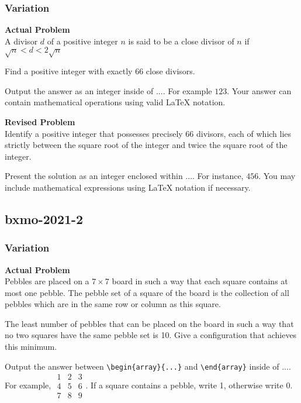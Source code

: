 \subsubsection{Variation}
\textbf{Actual Problem}\\
A divisor $d$ of a positive integer $n$ is said to be a close divisor of $n$ if $\sqrt{n} < d < 2\sqrt{n}$

Find a positive integer with exactly 66 close divisors.

Output the answer as an integer inside of $\boxed{...}$. For example $\boxed{123}$.
Your answer can contain mathematical operations using valid LaTeX notation.

\textbf{Revised Problem}\\
Identify a positive integer that possesses precisely 66 divisors, each of which lies strictly between the square root of the integer and twice the square root of the integer.

Present the solution as an integer enclosed within $\boxed{...}$. For instance, $\boxed{456}$. You may include mathematical expressions using LaTeX notation if necessary.

\subsection{bxmo-2021-2}
\subsubsection{Variation}
\textbf{Actual Problem}\\
Pebbles are placed on a $7 \times 7$ board in such a way that each square contains at most one pebble. The pebble set of a square of the board is the collection of all pebbles which are in the same row or column as this square.

The least number of pebbles that can be placed on the board in such a way that no two squares have the same pebble set is 10. Give a configuration that achieves this minimum.

Output the answer between \verb|\begin{array}{...}| and \verb|\end{array}| inside of $\boxed{...}$. For example, $\boxed{\begin{array}{ccc}1 & 2 & 3 \\ 4 & 5 & 6 \\ 7 & 8 & 9\end{array}}$.
If a square contains a pebble, write 1, otherwise write 0.

